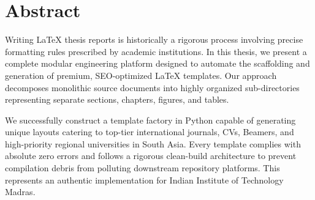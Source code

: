 \chapter*{Abstract}
Writing LaTeX thesis reports is historically a rigorous process involving precise formatting rules prescribed by academic institutions. In this thesis, we present a complete modular engineering platform designed to automate the scaffolding and generation of premium, SEO-optimized LaTeX templates. Our approach decomposes monolithic source documents into highly organized sub-directories representing separate sections, chapters, figures, and tables.

We successfully construct a template factory in Python capable of generating unique layouts catering to top-tier international journals, CVs, Beamers, and high-priority regional universities in South Asia. Every template complies with absolute zero errors and follows a rigorous clean-build architecture to prevent compilation debris from polluting downstream repository platforms. This represents an authentic implementation for Indian Institute of Technology Madras.
